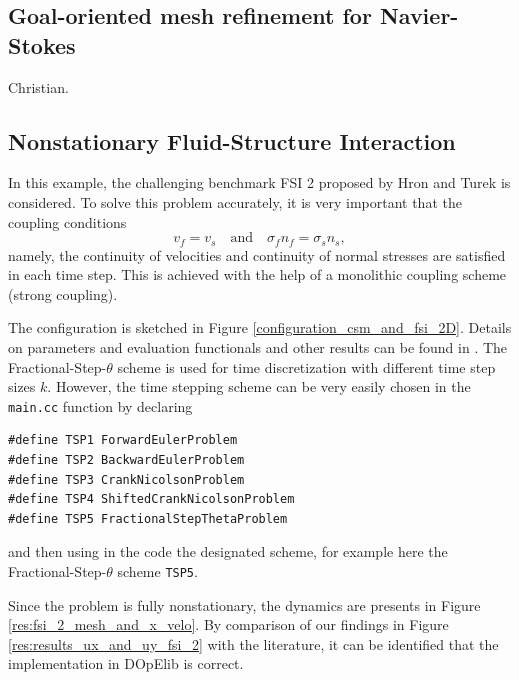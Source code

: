 \documentclass[prodmode,acmtoms]{acmsmall}
\numberwithin{equation}{section}
\begin{document}
\subsection{Goal-oriented mesh refinement for Navier-Stokes}
Christian.


\subsection{Nonstationary Fluid-Structure Interaction}
In this example, the challenging benchmark FSI 2
proposed by Hron and Turek \cite{HrTu06b} is considered.
To solve this problem accurately, it is very important that 
the coupling conditions
\[
v_f = v_s \quad \text{and} \quad \sigma_f n_f = \sigma_s n_s, 
\]
namely, the continuity of velocities and continuity of normal stresses
are satisfied in each time step. This is achieved with the help of 
a monolithic coupling scheme (strong coupling).

The configuration is 
sketched in Figure \ref{configuration_csm_and_fsi_2D}. Details 
on parameters and evaluation functionals and other results 
can be found in \cite{HrTu06b, BuSc06, TuHrMaRaWoAc10, DeHaeAnnBrVie10, Wi11}. 
The Fractional-Step-$\theta$ scheme is used for time discretization with
different time step sizes $k$. However, the time stepping scheme can be 
very easily chosen in the \texttt{main.cc} function by declaring
\begin{lstlisting}
#define TSP1 ForwardEulerProblem
#define TSP2 BackwardEulerProblem
#define TSP3 CrankNicolsonProblem
#define TSP4 ShiftedCrankNicolsonProblem
#define TSP5 FractionalStepThetaProblem
\end{lstlisting}
and then using in the code the designated scheme, 
for example here the Fractional-Step-$\theta$ scheme
\texttt{TSP5}.





Since the problem is fully nonstationary, the 
dynamics are presents in Figure \ref{res:fsi_2_mesh_and_x_velo}. 
By comparison of our findings in Figure \ref{res:results_ux_and_uy_fsi_2}
with the literature, it can be identified that 
the implementation in DOpElib is correct.
\end{document}
